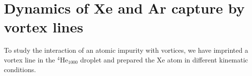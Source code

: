 

\section{Dynamics of  Xe and Ar capture by vortex lines}
To study the interaction of an atomic impurity with vortices, 
we have imprinted a vortex line in the $^4$He$_{1000}$ droplet 
and prepared the Xe atom in different kinematic conditions. 


